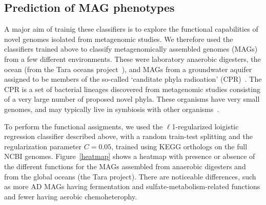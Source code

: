 \documentclass[10pt,letterpaper]{article}
\begin{document}
\subsection*{Prediction of MAG phenotypes}
A major aim of trainig these classifiers is to explore the functional capabilities of novel genomes isolated from metagenomic studies. We therefore used the classifiers trained above to classify metagenomically assembled genomes (MAGs) from a few different environments. These were laboratory anaerobic digesters, the ocean (from the Tara oceans project~\cite{Zhang2015}), and MAGs from a groundwater aquifer assigned to be members of the so-called `canditate phyla radioation' (CPR)~\cite{Anantharaman2016}. The CPR is a set of bacterial lineages discovered from metagenomic studies consisting of a very large number of proposed novel phyla. These organisms have very small genomes, and may typically live in symbiosis with other organisms~\cite{Danczak2017}.

To perform the functional assigments, we used the $\ell$1-regularized loigistic regression classifier described above, with a random train-test splitting and the regularization parameter $C=0.05$, trained using KEGG orthologs on the full NCBI genomes. Figure~\ref{heatmap} shows a heatmap with presence or absence of the different functions for the MAGs assembled from anaerobic digesters and from the global oceans (the Tara project). There are noticeable differences, such as more AD MAGs having fermentation and sulfate-metabolism-related functions and fewer having aerobic chemoheterophy. 
\end{document}
